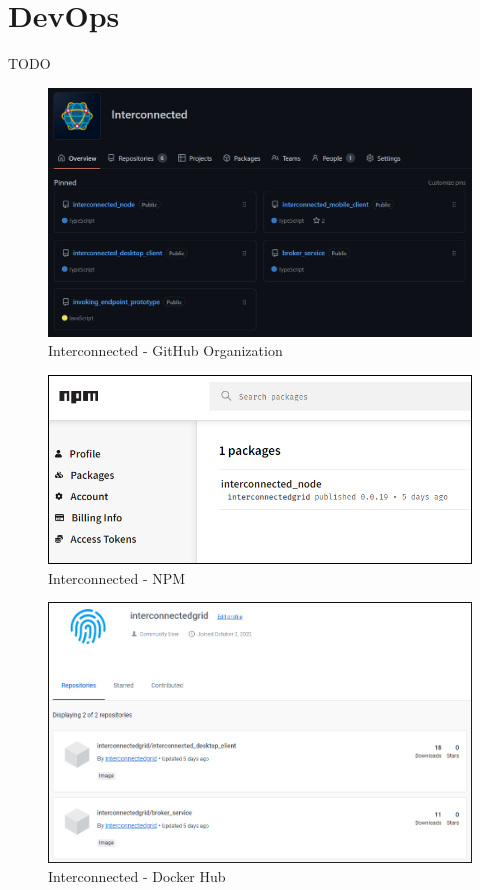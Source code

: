 \section{DevOps}
TODO

\begin{figure}[!ht]
    \centering
    \includegraphics[width=\linewidth]{document/chapters/chapter_7/images/interconnected_organization.png}
    \caption{Interconnected - GitHub Organization}
    \label{fig:interconnected_organization}
\end{figure}

\begin{figure}[!ht]
    \centering
    \includegraphics[scale=0.45]{document/chapters/chapter_7/images/interconnected_npm.png}
    \caption{Interconnected - NPM}
    \label{fig:interconnected_npm}
\end{figure}

\begin{figure}[!ht]
    \centering
    \includegraphics[width=\linewidth]{document/chapters/chapter_7/images/interconnected_dockerhub.png}
    \caption{Interconnected - Docker Hub}
    \label{fig:interconnected_dockerhub}
\end{figure}

